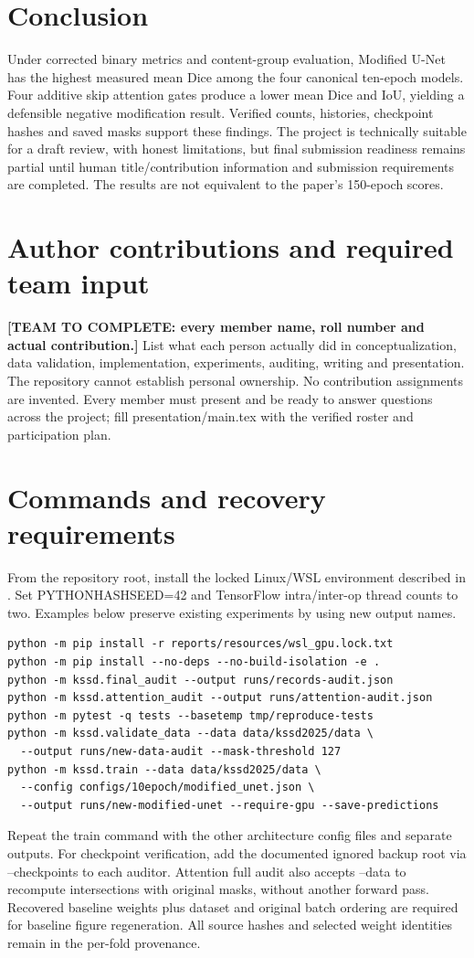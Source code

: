 \documentclass[a4paper,fleqn]{cas-sc}
\newcommand{\artifact}[1]{\texttt{\detokenize{#1}}}
\begin{document}
\section{Conclusion}
Under corrected binary metrics and content-group evaluation, Modified U-Net has the highest measured mean Dice among the four canonical ten-epoch models. Four additive skip attention gates produce a lower mean Dice and IoU, yielding a defensible negative modification result. Verified counts, histories, checkpoint hashes and saved masks support these findings. The project is technically suitable for a draft review, with honest limitations, but final submission readiness remains partial until human title/contribution information and submission requirements are completed. The results are not equivalent to the paper's 150-epoch scores.

\section{Author contributions and required team input}
\textbf{[TEAM TO COMPLETE: every member name, roll number and actual contribution.]}
List what each person actually did in conceptualization, data validation, implementation, experiments, auditing, writing and presentation. The repository cannot establish personal ownership. No contribution assignments are invented. Every member must present and be ready to answer questions across the project; fill presentation/main.tex with the verified roster and participation plan.



\appendix
\section{Commands and recovery requirements}\label{sec:commands}
From the repository root, install the locked Linux/WSL environment described in \artifact{docs/GPU_ENVIRONMENT.md}. Set PYTHONHASHSEED=42 and TensorFlow intra/inter-op thread counts to two. Examples below preserve existing experiments by using new output names.
\begin{verbatim}
python -m pip install -r reports/resources/wsl_gpu.lock.txt
python -m pip install --no-deps --no-build-isolation -e .
python -m kssd.final_audit --output runs/records-audit.json
python -m kssd.attention_audit --output runs/attention-audit.json
python -m pytest -q tests --basetemp tmp/reproduce-tests
python -m kssd.validate_data --data data/kssd2025/data \
  --output runs/new-data-audit --mask-threshold 127
python -m kssd.train --data data/kssd2025/data \
  --config configs/10epoch/modified_unet.json \
  --output runs/new-modified-unet --require-gpu --save-predictions
\end{verbatim}
Repeat the train command with the other architecture config files and separate outputs. For checkpoint verification, add the documented ignored backup root via --checkpoints to each auditor. Attention full audit also accepts --data to recompute intersections with original masks, without another forward pass. Recovered baseline weights plus dataset and original batch ordering are required for baseline figure regeneration. All source hashes and selected weight identities remain in the per-fold provenance.
\end{document}
